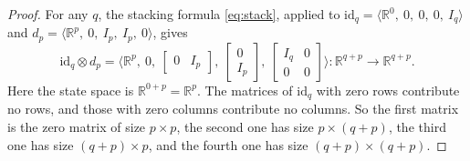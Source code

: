 \documentclass[11pt,a4paper]{article}
\theoremstyle{plain}
\theoremstyle{definition}
\theoremstyle{remark}
\newcommand{\R}{\mathbb{R}}
\newcommand{\id}{\mathrm{id}}
\newcommand{\sys}[5]{\bigl\langle #1,\ #2,\ #3,\ #4,\ #5 \bigr\rangle}
\begin{document}
\begin{proof}
    For any $q$, the stacking formula \cref{eq:stack}, applied to $\id_q = \sys{\R^0}{0}{0}{0}{I_q}$ and $d_p = \sys{\R^p}{0}{I_p}{I_p}{0}$, gives
    \begin{equation}
        \label{eq:id-stack-d}
        \id_q \otimes d_p = \sys{\R^{p}}{0}
        {\begin{bmatrix} 0 & I_p \end{bmatrix}}
        {\begin{bmatrix} 0 \\ I_p \end{bmatrix}}
        {\begin{bmatrix} I_q & 0 \\ 0 & 0 \end{bmatrix}}
        \colon \R^{q+p} \to \R^{q+p} .
    \end{equation}
    Here the state space is $\R^{0+p} = \R^p$.
    The matrices of $\id_q$ with zero rows contribute no rows, and those with zero columns contribute no columns.
    So the first matrix is the zero matrix of size $p \times p$, the second one has size $p \times (q+p)$, the third one has size $(q+p) \times p$, and the fourth one has size $(q+p) \times (q+p)$.


\end{proof}
\end{document}
